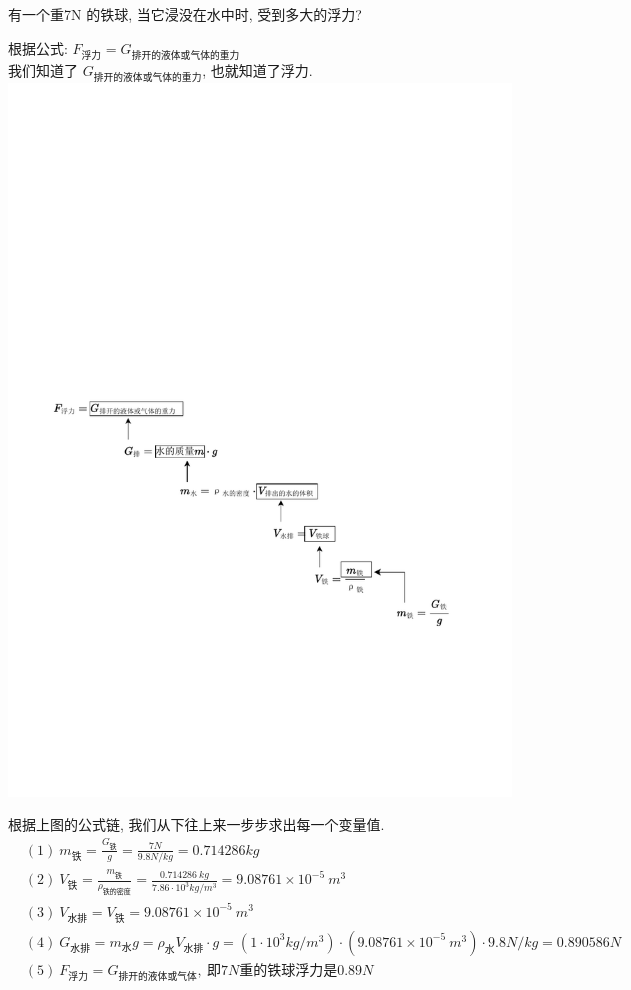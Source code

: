 \documentclass[UTF8]{ctexart}
\begin{document}
\begin{tcolorbox}[title = {例},boxrule={0.1em},colframe={black!10}, colback={black!3},colbacktitle={black!10},coltitle={black}]
有一个重7N 的铁球, 当它浸没在水中时, 受到多大的浮力? 

根据公式: $F_{\text{浮力}}=G_{\text{排开的液体或气体的重力}}$ \\
我们知道了 $G_{\text{排开的液体或气体的重力}}$, 也就知道了浮力. \\

\includegraphics[width=1\textwidth]{img/0043.pdf}

根据上图的公式链, 我们从下往上来一步步求出每一个变量值. 
\begin{align*}
		& (1)\ m_{\text{铁}}=\frac{G_{\text{铁}}}{g}=\frac{7N}{9.8N/kg}=0.714286kg\\
	& (2)\ V_{\text{铁}}=\frac{m_{\text{铁}}}{\rho _{\text{铁的密度}}}=\frac{0.714286\ kg}{7.86\cdot 10^3kg/m^3}=9.08761\times 10^{-5}\ m^3\\
	& \left( 3 \right) \ V_{\text{水排}}=V_{\text{铁}}=9.08761\times 10^{-5}\ m^3\\
	& (4)\ G_{\text{水排}}=m_{\text{水}}g=\rho _{\text{水}}V_{\text{水排}}\cdot g=\left( 1\cdot 10^3kg/m^3 \right) \cdot \left( 9.08761\times 10^{-5}\ m^3 \right) \cdot 9.8N/kg=0.890586N\\
	& \left( 5 \right) \ F_{\text{浮力}}=G_{\text{排开的液体或气体}},\ \text{即}7N\text{重的铁球浮力是}0.89N\\	
\end{align*}

\end{tcolorbox}
\end{document}
